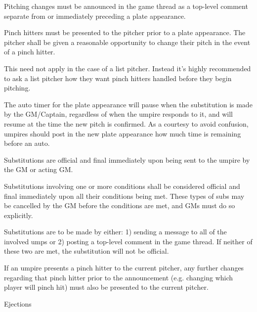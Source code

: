 \begin{deepEnumerate}
\begin{deepEnumerate}
\begin{deepEnumerate}
\begin{deepEnumerate}
\begin{deepEnumerate}
				\end{deepEnumerate}
			\end{deepEnumerate}
		\end{deepEnumerate}
		\item Pitching changes must be announced in the game thread as a top-level comment separate from or immediately preceding a plate appearance.
		\item Pinch hitters must be presented to the pitcher prior to a plate appearance. 
		The pitcher shall be given a reasonable opportunity to change their pitch in the event of a pinch hitter.
		\begin{deepEnumerate}
			\item This need not apply in the case of a list pitcher. 
			Instead it’s highly recommended to ask a list pitcher how they want pinch hitters handled before they begin pitching.
			\item The auto timer for the plate appearance will pause when the substitution is made by the GM/Captain, 
			regardless of when the umpire responds to it, 
			and will resume at the time the new pitch is confirmed. 
			As a courtesy to avoid confusion, 
			umpires should post in the new plate appearance how much time is remaining before an auto.
		\end{deepEnumerate}
		\item Substitutions are official and final immediately upon being sent to the umpire by the GM or acting GM.
		\begin{deepEnumerate}
			\item Substitutions involving one or more conditions shall be considered official and final immediately upon all their conditions being met. These types of subs may be cancelled by the GM before the conditions are met, and GMs must do so explicitly.
			\item Substitutions are to be made by either: 1) sending a message to all of the involved umps or 2) posting a top-level comment in the game thread. If neither of these two are met, the substitution will not be official.
			\item If an umpire presents a pinch hitter to the current pitcher, 
			any further changes regarding that pinch hitter prior to the announcement 
			(e.g. changing which player will pinch hit) 
			must also be presented to the current pitcher.
		\end{deepEnumerate}
	\end{deepEnumerate}
	\item Ejections
	\begin{deepEnumerate}

\end{deepEnumerate}
\end{deepEnumerate}
